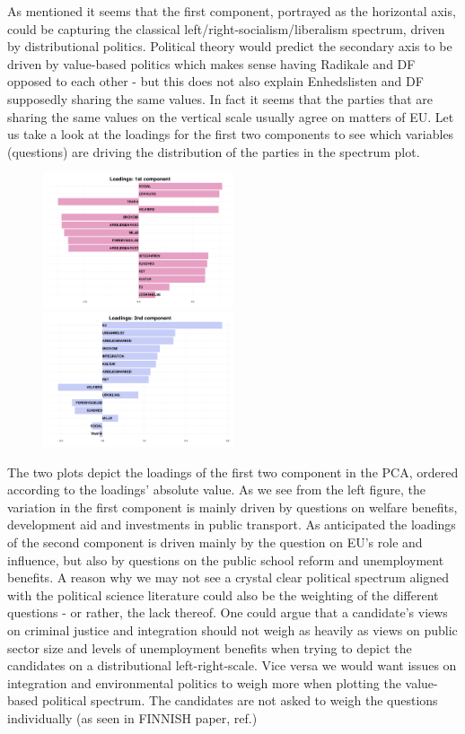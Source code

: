 As mentioned it seems that the first component, portrayed as the horizontal axis, could be capturing the classical left/right-socialism/liberalism spectrum, driven by distributional politics. Political theory would predict the secondary axis to be driven by value-based politics which makes sense having Radikale and DF opposed to each other - but this does not also explain Enhedslisten and DF supposedly sharing the same values. In fact it seems that the parties that are sharing the same values on the vertical scale usually agree on matters of EU. Let us take a look at the loadings for the first two components to see which variables (questions) are driving  the distribution of the parties in the spectrum plot.
\begin{figure}[H]
\includegraphics[width=0.5\textwidth]{loadings1}
\includegraphics[width=0.5\textwidth]{loadings2}
\end{figure}
The two plots depict the loadings of the first two component in the PCA, ordered according to the loadings’ absolute value. As we see from the left figure, the variation in the first component is mainly driven by questions on welfare benefits, development aid and investments in public transport. As anticipated the loadings of the second component is driven mainly by the question on EU’s role and influence, but also by questions on the public school reform and unemployment benefits. 
A reason why we may not see a crystal clear political spectrum aligned with the political science literature could also be the weighting of the different questions - or rather, the lack thereof. One could argue that a candidate’s views on criminal justice and integration should not weigh as heavily as views on public sector size and levels of unemployment benefits when trying to depict the candidates on a distributional left-right-scale. Vice versa we would want issues on integration and environmental politics to weigh more when plotting the value-based political spectrum. The candidates are not asked to weigh the questions individually (as seen in FINNISH paper, ref.)
